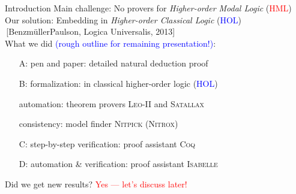 \begin{frame}{Introduction} \large
Main challenge: \hfill No provers for \emph{Higher-order Modal Logic\/} (\textcolor{red}{HML}) \\[1em]

Our solution: \hfill Embedding in \emph{Higher-order Classical Logic\/} (\textcolor{blue}{HOL}) \\
\,\hfill {\small [Benzm\"ullerPaulson, Logica Universalis, 2013]} \\[2em]

What we did \textcolor{blue}{(rough outline for remaining
  presentation!)}: \\

\begin{itemize}
\item[A:] pen and paper: detailed natural deduction proof 
\item[B:] formalization: in classical higher-order logic (\textcolor{blue}{HOL})
\item[] automation: theorem provers \textsc{Leo-II} and \textsc{Satallax} 
\item[] consistency: model finder \textsc{Nitpick (Nitrox)} 
\item[C:] step-by-step verification: proof assistant \textsc{Coq} 
\item[D:] automation \& verification: proof assistant 
  \textsc{Isabelle} \\[2em]
\end{itemize}
Did we get new results? \hfill  \textcolor{red}{Yes --- let's discuss later!}
\end{frame}
